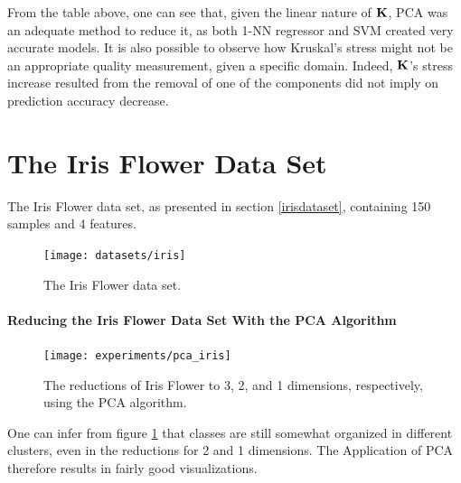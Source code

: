 From the table above, one can see that, given the linear nature of $\mathbf{K}$, PCA was an adequate method to reduce it, as both 1-NN regressor and SVM created very accurate models. It is also possible to observe how Kruskal's stress might not be an appropriate quality measurement, given a specific domain. Indeed, $\mathbf{K}$'s stress increase resulted from the removal of one of the components did not imply on prediction accuracy decrease.

\clearpage
\section{The Iris Flower Data Set}

The Iris Flower data set, as presented in section \ref{irisdataset}, containing 150 samples and 4 features.
\newline\newline

\begin{figure}[H]
	\centering
	\captionsetup{justification=centering}
	\texttt{[image: datasets/iris]}
	\caption{The Iris Flower data set.}
\end{figure}

\newpage
\paragraph{Reducing the Iris Flower Data Set With the PCA Algorithm}

\begin{figure}[H]
	\centering
	\captionsetup{justification=centering}
	\texttt{[image: experiments/pca\_iris]}
	\caption{The reductions of Iris Flower to 3, 2, and 1 dimensions, respectively, using the PCA algorithm.}
	\label{fig:dsirispca}
\end{figure}

One can infer from figure \ref{fig:dsirispca} that classes are still somewhat organized in different clusters, even in the reductions for 2 and 1 dimensions. The Application of PCA therefore results in fairly good visualizations.

